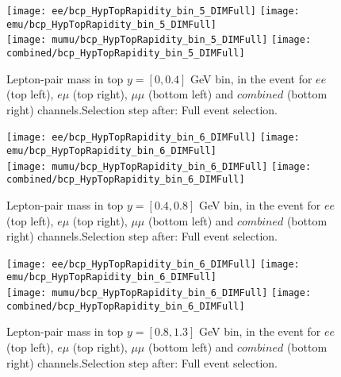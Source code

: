 \clearpage
\newpage


\begin{figure}
  \texttt{[image: ee/bcp\_HypTopRapidity\_bin\_5\_DIMFull]}
  \texttt{[image: emu/bcp\_HypTopRapidity\_bin\_5\_DIMFull]}\\
  \texttt{[image: mumu/bcp\_HypTopRapidity\_bin\_5\_DIMFull]}
  \texttt{[image: combined/bcp\_HypTopRapidity\_bin\_5\_DIMFull]}
\caption{Lepton-pair mass in top $y = [0,0.4]$ GeV bin, in the event for $ee$ (top left), $e\mu$ (top right), $\mu\mu$ (bottom left) and $combined$ (bottom right) channels.\newline Selection step after: Full event selection.}
\end{figure}

\clearpage
\newpage

\begin{figure}
  \texttt{[image: ee/bcp\_HypTopRapidity\_bin\_6\_DIMFull]}
  \texttt{[image: emu/bcp\_HypTopRapidity\_bin\_6\_DIMFull]}\\
  \texttt{[image: mumu/bcp\_HypTopRapidity\_bin\_6\_DIMFull]}
  \texttt{[image: combined/bcp\_HypTopRapidity\_bin\_6\_DIMFull]}
\caption{Lepton-pair mass in top $y = [0.4,0.8]$ GeV bin, in the event for $ee$ (top left), $e\mu$ (top right), $\mu\mu$ (bottom left) and $combined$ (bottom right) channels.\newline Selection step after: Full event selection.}
\end{figure}

\clearpage
\newpage
\begin{figure}
  \texttt{[image: ee/bcp\_HypTopRapidity\_bin\_6\_DIMFull]}
  \texttt{[image: emu/bcp\_HypTopRapidity\_bin\_6\_DIMFull]}\\
  \texttt{[image: mumu/bcp\_HypTopRapidity\_bin\_6\_DIMFull]}
  \texttt{[image: combined/bcp\_HypTopRapidity\_bin\_6\_DIMFull]}
\caption{Lepton-pair mass in top $y = [0.8,1.3]$ GeV bin, in the event for $ee$ (top left), $e\mu$ (top right), $\mu\mu$ (bottom left) and $combined$ (bottom right) channels.\newline Selection step after: Full event selection.}
\end{figure}

